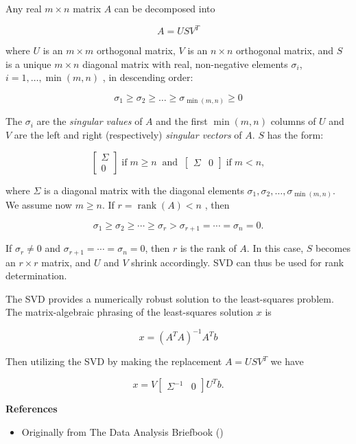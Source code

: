 \documentclass{article}
\begin{document}
Any real $m \times n$ matrix $A$ can be decomposed into

$$ A = USV^T $$

where $U$ is an $m \times m$ orthogonal matrix, $V$ is an $n \times n$ orthogonal matrix, and $S$ is a unique $m \times n$ diagonal matrix with real, non-negative elements $\sigma_i$, $i = 1, \ldots , \min(m,n)$ , in descending order:

$$ \sigma_1 \ge \sigma_2 \ge \dots \ge \sigma_{\min(m,n)} \ge 0 $$

The $\sigma_i$ are the \emph{singular values} of $A$ and the first $\min(m,n)$ columns of $U$ and $V$ are the left and right (respectively) \emph{singular vectors} of $A$.  $S$ has the form:

$$ \begin{bmatrix}\Sigma \\ 0\end{bmatrix} \operatorname{if} m \ge n \;\operatorname{and}\; \begin{bmatrix}\Sigma & 0 \end{bmatrix} \operatorname{if} m < n,$$

where $\Sigma$ is a diagonal matrix with the diagonal elements $\sigma_1,\sigma_2,\ldots , \sigma_{\min(m,n)}$.  We assume now $m \ge n$. If $r=\operatorname{rank}(A) < n $ , then

$$ \sigma_1 \ge \sigma_2 \ge \cdots \ge \sigma_r > \sigma_{r+1} = \cdots = \sigma_n = 0.$$

If $\sigma_r \ne 0$ and $\sigma_{r+1} = \cdots = \sigma_n = 0$, then $r$ is the rank of $A$.  In this case, $S$ becomes an $r \times r$ matrix, and $U$ and $V$ shrink accordingly.  SVD can thus be used for rank determination.

The SVD provides a numerically robust solution to the least-squares problem.  The matrix-algebraic phrasing of the least-squares solution $x$ is 

$$ x = (A^T A)^{-1} A^T b $$

Then utilizing the SVD by making the replacement $A=USV^T$ we have

$$ x = V \begin{bmatrix} \Sigma^{-1} & 0 \end{bmatrix} U^T b .$$

{\bf References}

\begin{itemize}
\item Originally from The Data Analysis Briefbook ()
\end{itemize}
\end{document}
